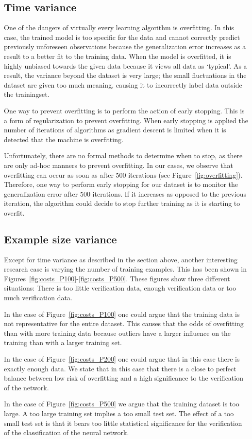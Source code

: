 \subsection{Time variance}
One of the dangers of virtually every learning algorithm is overfitting. 
In this case, the trained model is too specific for the data and cannot correctly predict previously unforeseen observations because the generalization error increases as a result to a better fit to the training data. 
When the model is overfitted, it is highly unbiased towards the given data because it views all data as `typical'.
As a result, the variance beyond the dataset is very large; the small fluctuations in the dataset are given too much meaning, causing it to incorrectly label data outside the trainingset.

One way to prevent overfitting is to perform the action of early stopping. 
This is a form of regularization to prevent overfitting. 
When early stopping is applied the number of iterations of algorithms as gradient descent is limited when it is detected that the machine is overfitting. 

Unfortunately, there are no formal methods to determine when to stop, as there are only ad-hoc manners to prevent overfitting. 
In our cases, we observe that overfitting can occur as soon as after 500 iterations (see Figure~\ref{fig:overfitting}). 
Therefore, one way to perform early stopping for our dataset is to monitor the generalization error after 500 iterations.
If it increases as opposed to the previous iteration, the algorithm could decide to stop further training as it is starting to overfit.

\subsection{Example size variance}
Except for time variance as described in the section above, another interesting research case is varying the number of training examples. 
This has been shown in Figures~\ref{fig:costs_P100}-\ref{fig:costs_P500}.
These figures show three different situations: There is too little verification data, enough verification data or too much verification data. 

In the case of Figure~\ref{fig:costs_P100} one could argue that the training data is not representative for the entire dataset. 
This causes that the odds of overfitting than with more training data because outliers have a larger influence on the training than with a larger training set.

In the case of Figure~\ref{fig:costs_P200} one could argue that in this case there is exactly enough data.
We state that in this case that there is a close to perfect balance between low risk of overfitting and a high significance to the verification of the network.

In the case of Figure~\ref{fig:costs_P500} we argue that the training dataset is too large. 
A too large training set implies a too small test set. The effect of a too small test set is that it bears too little statistical significance for the verification of the classification of the neural network.
